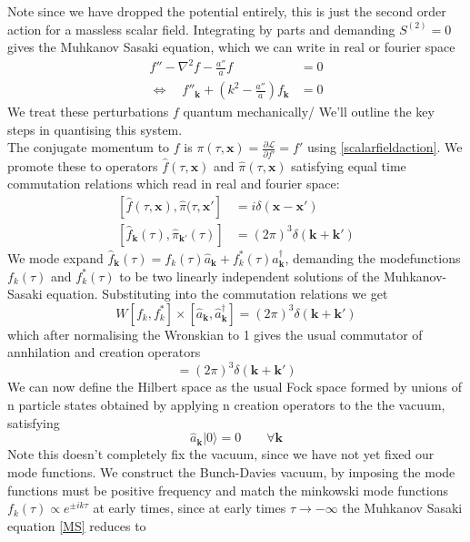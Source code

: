 \documentclass[a4paper,10pt]{article}
\renewcommand{\v}[1]{\mathbf{#1}}
\newcommand{\ann}[1]{\hat{a}_{\v{#1}}}
\newcommand{\cre}[1]{\hat{a}^\dagger_{\v{#1}}}
\newcommand{\vac}{|0\rangle}
\begin{document}
Note since we have dropped the potential entirely, this is just the second order action for a massless scalar field. Integrating by parts and demanding $S^{(2)}=0$ gives the Muhkanov Sasaki equation, which we can write in real or fourier space
\begin{equation}\begin{split}
f''-\nabla^2f-\frac{a''}{a}f &= 0 \\
\Leftrightarrow \quad f''_{\v{k}} + (k^2-\frac{a''}{a})f_{\v{k}} &= 0
\label{MS}
\end{split}\end{equation}
We treat these perturbations $f$ quantum mechanically/ We'll outline the key steps in quantising this system.\\
The conjugate momentum to $f$ is $\pi(\tau, \v{x}) =  \frac{\partial \mathcal{L}}{\partial f'} = f'$ using \ref{scalarfieldaction}. We promote these to operators $\hat{f}(\tau, \v{x})$ and $\hat{\pi}(\tau, \v{x})$ satisfying equal time commutation relations which read in real and fourier space:
\begin{equation}\begin{split}
[\hat{f}(\tau, \v{x}), \hat{\pi}(\tau, \v{x'}] &= i\delta(\v{x}-\v{x'}) \\
[\hat{f}_{\v{k}}(\tau), \hat{\pi}_{\v{k'}}(\tau)] &= (2\pi)^3\delta(\v{k}+\v{k'})
\end{split}\end{equation}
We mode expand $\hat{f}_{\v{k}}(\tau) = f_k(\tau)\ann{k}+f_k^*(\tau)\cre{k}$, demanding the modefunctions $f_k(\tau)$ and $f_k^*(\tau)$ to be two linearly independent solutions of the Muhkanov-Sasaki equation. Substituting into the commutation relations we get 
\begin{equation}
W[f_k,f_k^*]\times[\ann{k}, \cre{k}] = (2\pi)^3\delta(\v{k}+\v{k'})
\end{equation}
which after normalising the Wronskian to 1 gives the usual commutator of annhilation and creation operators
\begin{equation}
[\ann{k}, \cre{k}] = (2\pi)^3\delta(\v{k}+\v{k'})
\end{equation}
We can now define the Hilbert space as the usual Fock space formed by unions of n particle states obtained by applying n creation operators to the the vacuum, satisfying 
\begin{equation}
\ann{k}\vac =0 \qquad \forall \v{k}
\end{equation}
Note this doesn't completely fix the vacuum, since we have not yet fixed our mode functions. We construct the Bunch-Davies vacuum, by imposing the mode functions must be positive frequency and match the minkowski mode functions $f_k(\tau) \propto e^{\pm ik\tau}$ at early times, since at early times $\tau \rightarrow -\infty$ the Muhkanov Sasaki equation \ref{MS} reduces to 
\end{document}
